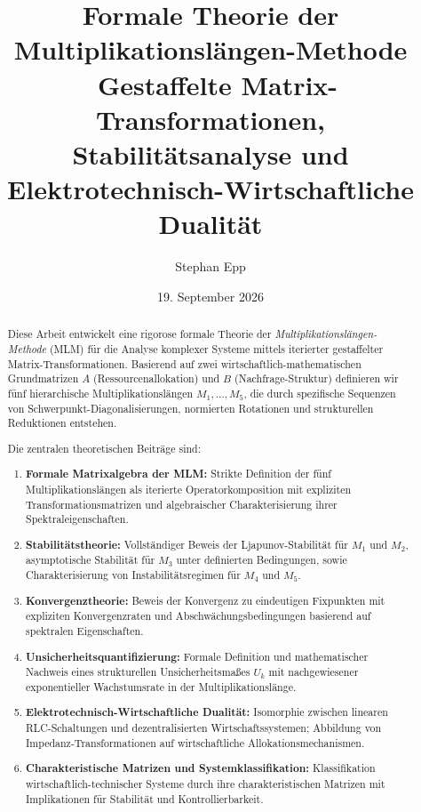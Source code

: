 \documentclass[a4paper,12pt]{article}
\title{\textbf{Formale Theorie der Multiplikationslängen-Methode}\\\
Gestaffelte Matrix-Transformationen, Stabilitätsanalyse und Elektrotechnisch-Wirtschaftliche Dualität}
\author{Stephan Epp}
\date{19. September 2026}
\theoremstyle{definition}
\begin{document}
\maketitle

\begin{abstract}

Diese Arbeit entwickelt eine rigorose formale Theorie der \emph{Multiplikationslängen-Methode} (MLM) für die Analyse komplexer Systeme mittels iterierter gestaffelter Matrix-Transformationen. Basierend auf zwei wirtschaftlich-mathematischen Grundmatrizen $A$ (Ressourcenallokation) und $B$ (Nachfrage-Struktur) definieren wir fünf hierarchische Multiplikationslängen $M_1, \ldots, M_5$, die durch spezifische Sequenzen von Schwerpunkt-Diagonalisierungen, normierten Rotationen und strukturellen Reduktionen entstehen.

Die zentralen theoretischen Beiträge sind:

\begin{enumerate}
\item \textbf{Formale Matrixalgebra der MLM:} Strikte Definition der fünf Multiplikationslängen als iterierte Operatorkomposition mit expliziten Transformationsmatrizen und algebraischer Charakterisierung ihrer Spektraleigenschaften.

\item \textbf{Stabilitätstheorie:} Vollständiger Beweis der Ljapunov-Stabilität für $M_1$ und $M_2$, asymptotische Stabilität für $M_3$ unter definierten Bedingungen, sowie Charakterisierung von Instabilitätsregimen für $M_4$ und $M_5$.

\item \textbf{Konvergenztheorie:} Beweis der Konvergenz zu eindeutigen Fixpunkten mit expliziten Konvergenzraten und Abschwächungsbedingungen basierend auf spektralen Eigenschaften.

\item \textbf{Unsicherheitsquantifizierung:} Formale Definition und mathematischer Nachweis eines strukturellen Unsicherheitsmaßes $U_k$ mit nachgewiesener exponentieller Wachstumsrate in der Multiplikationslänge.

\item \textbf{Elektrotechnisch-Wirtschaftliche Dualität:} Isomorphie zwischen linearen RLC-Schaltungen und dezentralisierten Wirtschaftssystemen; Abbildung von Impedanz-Transformationen auf wirtschaftliche Allokationsmechanismen.

\item \textbf{Charakteristische Matrizen und Systemklassifikation:} Klassifikation wirtschaftlich-technischer Systeme durch ihre charakteristischen Matrizen mit Implikationen für Stabilität und Kontrollierbarkeit.


\end{enumerate}
\end{abstract}
\end{document}
